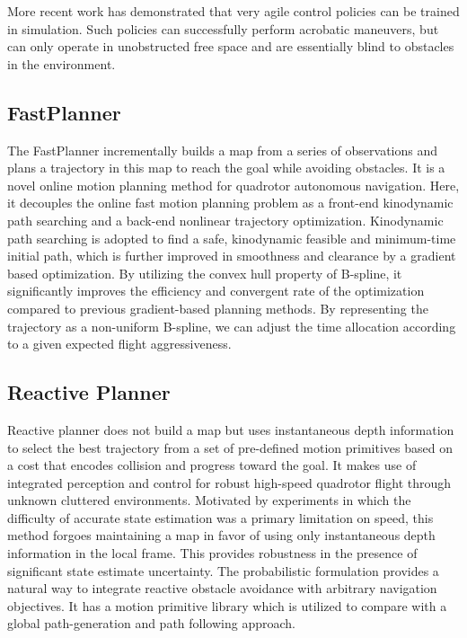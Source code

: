 More recent work has demonstrated that very agile control
policies can be trained in simulation. Such policies can successfully perform acrobatic maneuvers, but can only
operate in unobstructed free space and are essentially blind to obstacles
in the environment.

\subsection{FastPlanner }
The FastPlanner \cite{fastPlanner} incrementally builds a map from a
series of observations and plans a trajectory in this map to reach the
goal while avoiding obstacles. It is a novel online motion planning
method for quadrotor autonomous navigation. Here, it decouples the
online fast motion planning problem as a front-end kinodynamic
 path searching and a back-end nonlinear trajectory optimization. Kinodynamic path searching is adopted to find a safe,
kinodynamic feasible and minimum-time initial path, which is
further improved in smoothness and clearance by a gradient based optimization. By utilizing the convex hull property of
B-spline, it significantly improves the efficiency and convergent
rate of the optimization compared to previous gradient-based
planning methods. By representing the trajectory as a
non-uniform B-spline, we can adjust the time allocation according to a given expected flight aggressiveness. 

\subsection{Reactive Planner}
Reactive planner \cite{reactive_method} does not build a map but uses instantaneous depth information to select the best trajectory from a set of pre-defined motion primitives based on a cost that encodes collision and progress toward the goal. It makes use of integrated perception and control for robust high-speed quadrotor flight through unknown cluttered environments. Motivated by experiments in which the difficulty of accurate state estimation was a primary limitation on speed, this method forgoes maintaining a map in favor of using only instantaneous depth information in the local frame. This provides robustness in the presence of significant state estimate uncertainty. The probabilistic formulation provides a natural way to integrate reactive obstacle avoidance with arbitrary navigation objectives. It has a motion primitive library which is utilized to compare with a global path-generation and path following approach.



